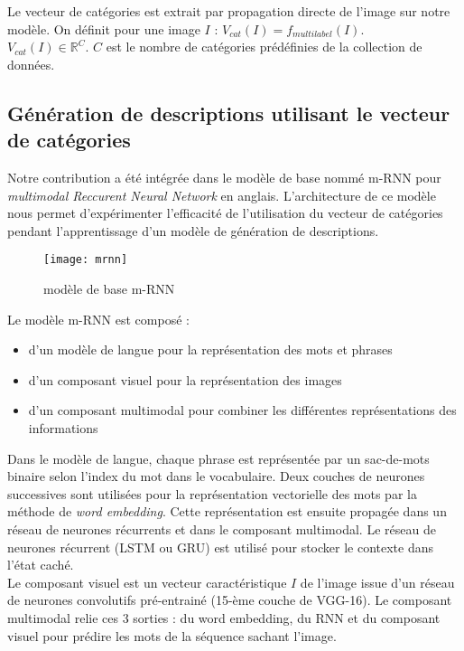 Le vecteur de catégories est extrait par propagation directe de l'image sur notre modèle. On définit  pour une image $I$ : $V_{cat}(I) = f_{multilabel}(I)$.\\
$V_{cat}(I) \in \mathbb{R}^{C}$. $C$ est le nombre de catégories prédéfinies de la collection de données.

\subsection{Génération de descriptions utilisant le vecteur de catégories} \label{gendesc}

\qquad Notre contribution a été intégrée dans le modèle de base \cite{mao2014explain} \cite{mao2014deep} nommé m-RNN pour\textit{ multimodal Reccurent Neural Network} en anglais. L'architecture de ce modèle nous permet d'expérimenter l'efficacité de l'utilisation du vecteur de catégories pendant l'apprentissage d'un modèle de génération de descriptions.

\medskip
\begin{figure}[h]
	\begin{center}
		\texttt{[image: mrnn]}
		\caption{modèle de base m-RNN  \cite{mao2014deep}}
	\end{center}
\end{figure}

Le modèle m-RNN est composé :
\begin{itemize}
	\item d'un modèle de langue pour la représentation des mots et  phrases
	\item d'un composant visuel pour la représentation des images
	\item d'un composant multimodal pour combiner les différentes représentations des informations
\end{itemize}

Dans le modèle de langue, chaque phrase est représentée par un sac-de-mots binaire selon l'index du mot dans le vocabulaire. Deux couches de neurones successives sont utilisées pour la représentation vectorielle des mots par la méthode de \textit{word embedding}. Cette représentation est ensuite propagée dans un réseau de neurones récurrents et dans le composant multimodal. Le réseau de neurones récurrent (LSTM ou GRU) est utilisé pour stocker le contexte dans l'état caché.\\
\qquad	Le composant visuel est un vecteur caractéristique $I$ de l'image issue d'un réseau de neurones convolutifs pré-entrainé (15-ème couche de VGG-16).
	Le composant multimodal relie ces 3 sorties : du word embedding, du RNN et du composant  visuel pour prédire les mots de la séquence  sachant l'image.
	
